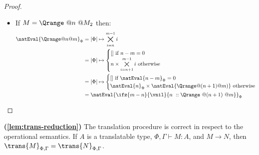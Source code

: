 \begin{proof}
\begin{itemize}
\begin{itemize}
            \item If $M\to N[x/M_1][y/M_2]$ with $M' = M_1::M_2$, then: 
            \begin{align*}
                \natEval{\Qfor{k}{M_1\ ::\ M_2}{N}}_\Phi &= |\Phi|\mapsto \natEval{N}_{x,y,\Phi}(y_1,[y_2,\dots,y_n],|\Phi|)\\
                &= |\Phi|\mapsto \natEval{N}_{x,y,\Phi}(M_1, M_2,|\Phi|)\\
                &= |\Phi|\mapsto \natEval{N[M_1/x][M_2/y]}_\Phi(|\Phi|)\\
                &= \natEval{N[M_1/x][M_2/y]}_\Phi
            \end{align*}
            where $[y_1,\dots,y_n] = \natEval{M_1::M_2}_\Phi(|\Phi|)$.
        \end{itemize}

        \item If $M= \Qrange\ @n\ @M_2$ then:
        \begin{align*}
            \natEval{\Qrange @n @m}_\Phi &= |\Phi| \mapsto \bigtimes\limits_{i=n}^{m-1} i\\
            &=|\Phi| \mapsto \begin{cases}
                [] \text{ if } n-m = 0 \\
                n\times \bigtimes\limits_{i=n+1}^{m-1} i \text{ otherwise}
            \end{cases}\\
            &=|\Phi| \mapsto \begin{cases}
                [] \text{ if } \natEval{n-m}_\Phi = 0 \\
                \natEval{n}_\Phi\times \natEval{\Qrange @(n+1) @ m)} \text{ otherwise}
            \end{cases}\\
            &= \natEval{\ifz{m-n}{\vnil}{n\ :: \Qrange\ @(n+1)\ @m}}_\Phi
        \end{align*}
    \end{itemize}
\end{proof}

\begin{lemma}{\!\textbf{(\ref{lem:trans-reduction})}}
    The translation procedure is correct in respect to the operational semantics.
    If $A$ is a translatable type, $\Phi, \Gamma \vdash M : A$, and $M \to N$,
    then $\trans{M}_{\Phi,\Gamma} = \trans{N}_{\Phi,\Gamma}$.
\end{lemma}

